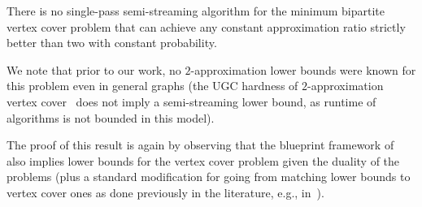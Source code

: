 \begin{corollary}\label{cor:vc}
	There is no single-pass semi-streaming algorithm for the minimum bipartite vertex cover problem that can achieve any constant approximation ratio strictly better than two with constant probability. 
\end{corollary}
We note that prior to our work, no $2$-approximation lower bounds were known for this problem even in general graphs (the UGC hardness of $2$-approximation vertex cover~\cite{KhotR03} does not imply a semi-streaming lower bound, 
as runtime of algorithms is not bounded in this model). 

The proof of this result is again by observing that the blueprint framework of~\cite{AssadiJX26} also implies lower bounds for the vertex cover problem given the duality of the problems (plus a standard modification for 
going from matching lower bounds to vertex cover ones as done previously in the literature, e.g., in~\cite{AssadiK17,DerakhshanGR25}). 



